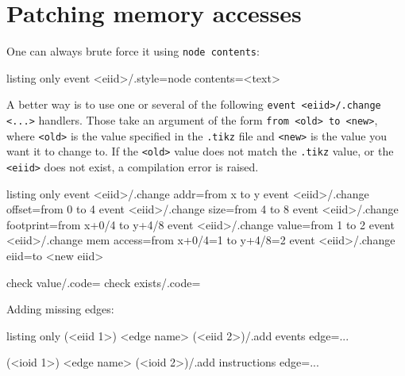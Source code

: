 \documentclass[a4paper]{article}
\begin{document}

\section{Patching memory accesses}\label{sec:patching}
One can always brute force it using \lstinline|node contents|:
\begin{tcblisting}{listing only}
event <eiid>/.style={node contents={<text>}}
\end{tcblisting}
A better way is to use one or several of the following \lstinline|event <eiid>/.change <...>| handlers.
Those take an argument of the form \lstinline|from <old> to <new>|, where \lstinline|<old>| is
the value specified in the \verb|.tikz| file and \lstinline|<new>| is the value you want
it to change to. If the \lstinline|<old>| value does not match the \verb|.tikz| value,
or the \lstinline|<eiid>| does not exist, a compilation error is raised.
\begin{tcblisting}{listing only}
event <eiid>/.change addr=from x to y
event <eiid>/.change offset=from 0 to 4
event <eiid>/.change size=from 4 to 8
event <eiid>/.change footprint=from x+0/4 to y+4/8 %
event <eiid>/.change value=from 1 to 2
event <eiid>/.change mem access={from x+0/4=1 to y+4/8=2} %
event <eiid>/.change eiid=to <new eiid> %

check value/.code={}  %
check exists/.code={} %
\end{tcblisting}


Adding missing edges:
\begin{tcblisting}{listing only}
(<eiid 1>) <edge name> (<eiid 2>)/.add events edge={...}

(<ioid 1>) <edge name> (<ioid 2>)/.add instructions edge={...}
\end{tcblisting}

\end{document}
